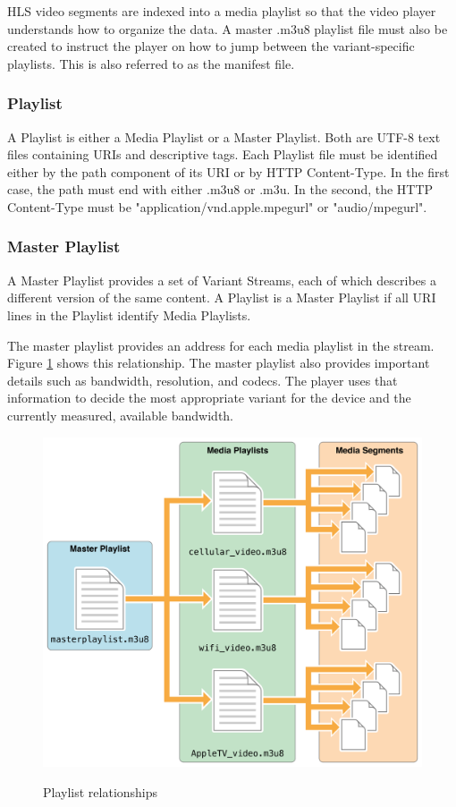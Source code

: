 HLS video segments are indexed into a media playlist so that the video player understands how to organize the data. A master .m3u8 playlist file must also be created to instruct the player on how to jump between the variant-specific playlists. This is also referred to as the manifest file. \cite{wowza}

\subsubsection{Playlist}
A Playlist is either a Media Playlist or a Master Playlist.  Both are UTF-8 text files containing URIs and descriptive tags. Each Playlist file must be identified either by the path component of its URI or by HTTP Content-Type.  In the first case, the path must end with either .m3u8 or .m3u.  In the second, the HTTP Content-Type must be "application/vnd.apple.mpegurl" or "audio/mpegurl".
   
\subsubsection{Master Playlist}

A Master Playlist provides a set of Variant Streams, each of which describes a different version of the same content. A Playlist is a Master Playlist if all URI lines in the Playlist identify Media Playlists.
   
The master playlist provides an address for each media playlist in the stream. Figure \ref{fig:masterpl} shows this relationship. The master playlist also provides important details such as bandwidth, resolution, and codecs. The player uses that information to decide the most appropriate variant for the device and the currently measured, available bandwidth. \cite{applehls}

\begin{figure}[!ht]
	\centering
\includegraphics[scale=0.23]{figures/masterplaylist.png}\\
	\caption{Playlist relationships \cite{applehls}}
	\label{fig:masterpl}
\end{figure}
   
